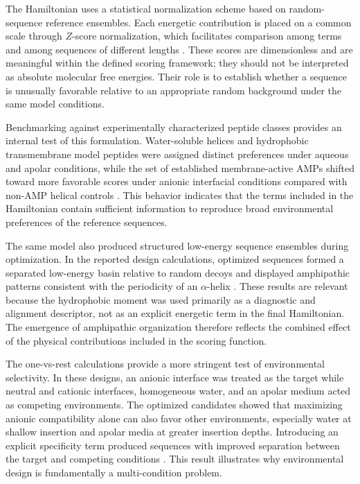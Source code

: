 The Hamiltonian uses a statistical normalization scheme based on random-sequence reference ensembles. Each energetic contribution is placed on a common scale through $Z$-score normalization, which facilitates comparison among terms and among sequences of different lengths \cite{DANI_HAMILTONIAN}. These scores are dimensionless and are meaningful within the defined scoring framework; they should not be interpreted as absolute molecular free energies. Their role is to establish whether a sequence is unusually favorable relative to an appropriate random background under the same model conditions.

Benchmarking against experimentally characterized peptide classes provides an internal test of this formulation. Water-soluble helices and hydrophobic transmembrane model peptides were assigned distinct preferences under aqueous and apolar conditions, while the set of established membrane-active AMPs shifted toward more favorable scores under anionic interfacial conditions compared with non-AMP helical controls \cite{DANI_HAMILTONIAN}. This behavior indicates that the terms included in the Hamiltonian contain sufficient information to reproduce broad environmental preferences of the reference sequences.

The same model also produced structured low-energy sequence ensembles during optimization. In the reported design calculations, optimized sequences formed a separated low-energy basin relative to random decoys and displayed amphipathic patterns consistent with the periodicity of an $\alpha$-helix \cite{DANI_HAMILTONIAN}. These results are relevant because the hydrophobic moment was used primarily as a diagnostic and alignment descriptor, not as an explicit energetic term in the final Hamiltonian. The emergence of amphipathic organization therefore reflects the combined effect of the physical contributions included in the scoring function.

The one-vs-rest calculations provide a more stringent test of environmental selectivity. In these designs, an anionic interface was treated as the target while neutral and cationic interfaces, homogeneous water, and an apolar medium acted as competing environments. The optimized candidates showed that maximizing anionic compatibility alone can also favor other environments, especially water at shallow insertion and apolar media at greater insertion depths. Introducing an explicit specificity term produced sequences with improved separation between the target and competing conditions \cite{DANI_HAMILTONIAN}. This result illustrates why environmental design is fundamentally a multi-condition problem.

